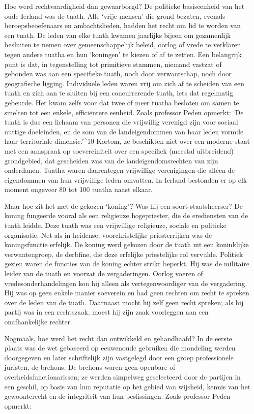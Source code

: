 \documentclass[
  a5paper,
  smalldemyvopaper,10pt,twoside,onecolumn,openright,extrafontsizes,hidelinks]{memoir}
\begin{document}
Hoe werd rechtvaardigheid dan gewaarborgd? De politieke basiseenheid van
het oude Ierland was de tuath. Alle `vrije mensen' die grond bezaten,
evenals beroepsbeoefenaars en ambachtslieden, hadden het recht om lid te
worden van een tuath. De leden van elke tuath kwamen jaarlijks bijeen om
gezamenlijk besluiten te nemen over gemeenschappelijk beleid, oorlog of
vrede te verklaren tegen andere tuatha en hun `koningen' te kiezen of af
te zetten. Een belangrijk punt is dat, in tegenstelling tot primitieve
stammen, niemand vastzat of gebonden was aan een specifieke tuath, noch
door verwantschap, noch door geografische ligging. Individuele leden
waren vrij om zich af te scheiden van een tuath en zich aan te sluiten
bij een concurrerende tuath, iets dat regelmatig gebeurde. Het kwam
zelfs voor dat twee of meer tuatha besloten om samen te smelten tot een
enkele, efficiëntere eenheid. Zoals professor Peden opmerkt: `De tuath
is dus een lichaam van personen die vrijwillig verenigd zijn voor
sociaal nuttige doeleinden, en de som van de landeigendommen van haar
leden vormde haar territoriale dimensie.'\^{}10 Kortom, ze beschikten
niet over een moderne staat met een aanspraak op soevereiniteit over een
specifiek (meestal uitbreidend) grondgebied, dat gescheiden was van de
landeigendomsrechten van zijn onderdanen. Tuatha waren daarentegen
vrijwillige verenigingen die alleen de eigendommen van hun vrijwillige
leden omvatten. In Ierland bestonden er op elk moment ongeveer 80 tot
100 tuatha naast elkaar.

Maar hoe zit het met de gekozen `koning'? Was hij een soort
staatsheerser? De koning fungeerde vooral als een religieuze
hogepriester, die de erediensten van de tuath leidde. Deze tuath was een
vrijwillige religieuze, sociale en politieke organisatie. Net als in
heidense, voorchristelijke priesterrijken was de koningsfunctie
erfelijk. De koning werd gekozen door de tuath uit een koninklijke
verwantengroep, de derbfine, die deze erfelijke priestelijke rol
vervulde. Politiek gezien waren de functies van de koning echter strikt
beperkt. Hij was de militaire leider van de tuath en voorzat de
vergaderingen. Oorlog voeren of vredesonderhandelingen kon hij alleen
als vertegenwoordiger van de vergadering. Hij was op geen enkele manier
soeverein en had geen rechten om recht te spreken over de leden van de
tuath. Daarnaast mocht hij zelf geen recht spreken; als hij partij was
in een rechtszaak, moest hij zijn zaak voorleggen aan een onafhankelijke
rechter.

Nogmaals, hoe werd het recht dan ontwikkeld en gehandhaafd? In de eerste
plaats was de wet gebaseerd op eeuwenoude gebruiken die mondeling werden
doorgegeven en later schriftelijk zijn vastgelegd door een groep
professionele juristen, de brehons. De brehons waren geen openbare of
overheidsfunctionarissen; ze werden simpelweg geselecteerd door de
partijen in een geschil, op basis van hun reputatie op het gebied van
wijsheid, kennis van het gewoonterecht en de integriteit van hun
beslissingen. Zoals professor Peden opmerkt:
\end{document}
